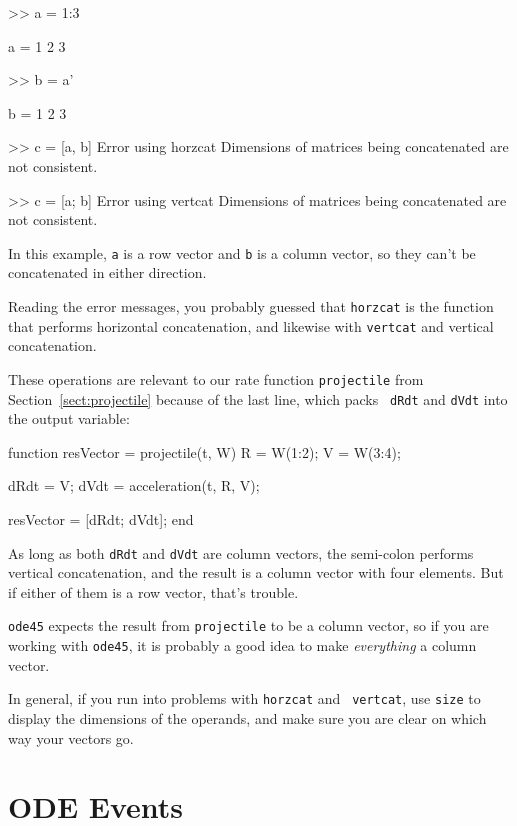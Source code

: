 \documentclass[
]{book}
\numberwithin{Answer}{chapter}
\numberwithin{Exercise}{chapter}
\begin{document}
\begin{code}
>> a = 1:3

a = 1     2     3

>> b = a'

b =  1
     2
     3

>> c = [a, b]
Error using horzcat
Dimensions of matrices being concatenated are not
consistent.

>> c = [a; b]
Error using vertcat
Dimensions of matrices being concatenated are not
consistent.
\end{code}

In this example, {\tt a} is a row vector and {\tt b} is a column
vector, so they can't be concatenated in either direction.

Reading the error messages, you probably guessed that {\tt horzcat}
is the function that performs horizontal concatenation, and likewise
with {\tt vertcat} and vertical concatenation.

These operations are relevant to our rate function {\tt projectile} from
Section~\ref{sect:projectile} because of the last line, which packs {\tt
dRdt} and {\tt dVdt} into the output variable:

\begin{code}
function resVector = projectile(t, W)
    R = W(1:2);
    V = W(3:4);

    dRdt = V;
    dVdt = acceleration(t, R, V);

    resVector = [dRdt; dVdt];
end
\end{code}

As long as both {\tt dRdt} and {\tt dVdt} are column vectors,
the semi-colon performs vertical concatenation, and the result is
a column vector with four elements.  But if either of them is a
row vector, that's trouble.

{\tt ode45} expects the result from {\tt projectile} to be a
column vector, so if you are working with {\tt ode45}, it is
probably a good idea to make {\em everything} a column vector.

In general, if you run into problems with {\tt horzcat} and {\tt
vertcat}, use {\tt size} to display the dimensions of the operands,
and make sure you are clear on which way your vectors go.


\section{ODE Events}
\label{sect:events}
\end{document}
